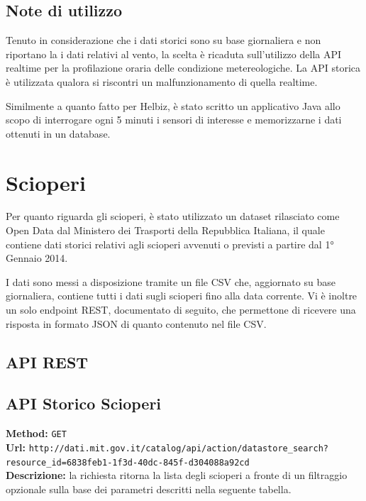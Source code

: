 \subsection{Note di utilizzo}

Tenuto in considerazione che i dati storici sono su base giornaliera e non riportano la
i dati relativi al vento, la scelta è ricaduta sull'utilizzo della API realtime per la
profilazione oraria delle condizione metereologiche. La API storica è utilizzata qualora
si riscontri un malfunzionamento di quella realtime.

Similmente a quanto fatto per Helbiz, è stato scritto un applicativo Java allo scopo di
interrogare ogni 5 minuti i sensori di interesse e memorizzarne i dati ottenuti in un
database.


\section{Scioperi}

Per quanto riguarda gli scioperi, è stato utilizzato un dataset rilasciato come Open Data
dal Ministero dei Trasporti della Repubblica Italiana, il quale contiene dati storici
relativi agli scioperi avvenuti o previsti a partire dal 1° Gennaio 2014.

I dati sono messi a disposizione tramite un file CSV che, aggiornato su base giornaliera,
contiene tutti i dati sugli scioperi fino alla data corrente. Vi è inoltre un solo 
endpoint REST, documentato di seguito, che permettone di ricevere una risposta in formato
JSON di quanto contenuto nel file CSV.

\subsection{API REST}

\subsection{API Storico Scioperi}

\textbf{Method:} \texttt{GET} \\
\textbf{Url:} \texttt{http://dati.mit.gov.it/catalog/api/action/datastore\_search?resource\_id=6838feb1-1f3d-40dc-845f-d304088a92cd} \\

\noindent\textbf{Descrizione:} la richiesta ritorna la lista degli scioperi a fronte di
un filtraggio opzionale sulla base dei parametri descritti nella seguente tabella.

